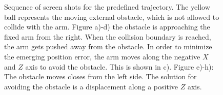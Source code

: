 \begin{figure}[h!]
{  	}
\caption{Sequence of screen shots for the predefined trajectory. The yellow ball represents the moving external obstacle, which is not allowed to collide with the arm. Figure a)-d) the obstacle is approaching the fixed arm from the right. When the collision boundary is reached, the arm gets pushed away from the obstacle. In order to minimize the emerging position error, the arm moves along the negative $X$ and $Z$ axis to avoid the obstacle. This is shown in c). Figure e)-h): The obstacle moves closes from the left side. The solution for avoiding the obstacle is a displacement along a positive $Z$ axis.} 
    \label{fig:externobjectmoves}
\end{figure}

